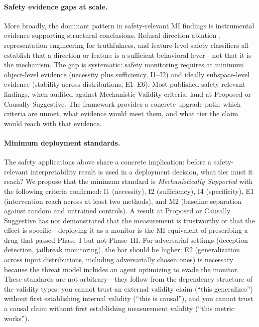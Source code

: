\documentclass{article}
\begin{document}
\paragraph{Safety evidence gaps at scale.}
More broadly, the dominant pattern in safety-relevant MI findings is instrumental evidence supporting structural conclusions.  Refusal direction ablation \citep{arditi2024refusal}, representation engineering for truthfulness, and feature-level safety classifiers all establish that a direction or feature is a sufficient behavioral lever---not that it is the mechanism.  The gap is systematic: safety monitoring requires at minimum object-level evidence (necessity plus sufficiency, I1--I2) and ideally subspace-level evidence (stability across distributions, E1--E6).  Most published safety-relevant findings, when audited against Mechanistic Validity criteria, land at Proposed or Causally Suggestive.  The framework provides a concrete upgrade path: which criteria are unmet, what evidence would meet them, and what tier the claim would reach with that evidence.

\paragraph{Minimum deployment standards.}
The safety applications above share a concrete implication: before a safety-relevant interpretability result is used in a deployment decision, what tier must it reach? We propose that the minimum standard is \emph{Mechanistically Supported} with the following criteria confirmed: I1 (necessity), I2 (sufficiency), I4 (specificity), E1 (intervention reach across at least two methods), and M2 (baseline separation against random and untrained controls). A result at Proposed or Causally Suggestive has not demonstrated that the measurement is trustworthy or that the effect is specific---deploying it as a monitor is the MI equivalent of prescribing a drug that passed Phase~I but not Phase~III. For adversarial settings (deception detection, jailbreak monitoring), the bar should be higher: E2 (generalization across input distributions, including adversarially chosen ones) is necessary because the threat model includes an agent optimizing to evade the monitor. These standards are not arbitrary---they follow from the dependency structure of the validity types: you cannot trust an external validity claim (``this generalizes'') without first establishing internal validity (``this is causal''), and you cannot trust a causal claim without first establishing measurement validity (``this metric works'').
\end{document}
